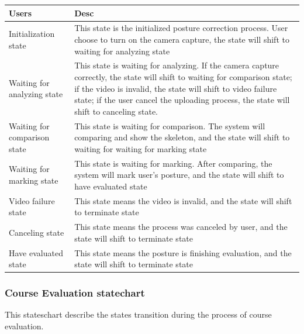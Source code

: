 \documentclass[16pt]{scrreprt}
\begin{document}
\begin{center}
    \begin{tabular}{p{5cm}p{12cm}}
        \hline
	    Users & Desc\\
        \hline
	    Initialization state &  This state is the initialized posture correction process. User choose to turn on the camera capture, the state will shift to waiting for analyzing state \\
        \hline
	    Waiting for analyzing state & This state is waiting for analyzing. If the camera capture correctly, the state will shift to waiting for comparison state; if the video is invalid, the state will shift to video failure state; if the user cancel the uploading process, the state will shift to canceling state.\\
        \hline
        Waiting for comparison state & This state is waiting for comparison. The system will comparing and show the skeleton, and the state will shift to waiting for waiting for marking state\\
        \hline
        Waiting for marking state & This state is waiting for marking. After comparing, the system will mark user's posture, and the state will shift to have evaluated state\\
        \hline
        Video failure state & This state means the video is invalid, and the state will shift to terminate state\\
        \hline
        Canceling state & This state means the process was canceled by user, and the state will shift to terminate state\\
        \hline
        Have evaluated state & This state means the posture is finishing evaluation, and the state will shift to terminate state\\
        \hline
    \end{tabular}
\end{center}

\subsubsection{Course Evaluation statechart}

This stateschart describe the states transition during the process of course evaluation.
\end{document}
